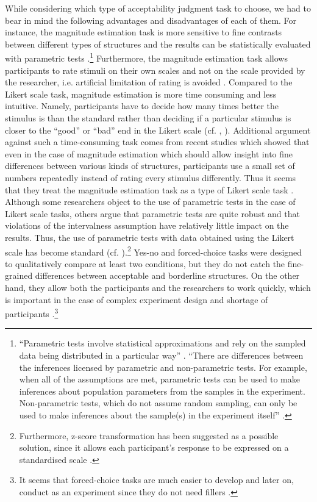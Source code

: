 While considering which type of acceptability judgment task to choose, we had to bear in mind the following advantages and disadvantages of each of them. For instance, the magnitude estimation task is more sensitive to fine contrasts between different types of structures and the results can be statistically evaluated with parametric tests \citep[cf.][8]{Dabrowska10}.\footnote{“Parametric tests involve statistical approximations and rely on the sampled data being distributed in a particular way” \citep[322]{Gries13}. “There are differences between the inferences licensed by parametric and non-parametric tests. For example, when all of the assumptions are met, parametric tests can be used to make inferences about population parameters from the samples in the experiment. Non-parametric tests, which do not assume random sampling, can only be used to make inferences about the sample(s) in the experiment itself” \citep[44]{SchutzeSprouse13}.} Furthermore, the magnitude estimation task allows participants to rate stimuli on their own scales and not on the scale provided by the researcher, i.e. artificial limitation of rating is avoided \citep[103]{Hoffmann13}. Compared to the Likert scale task, magnitude estimation is more time consuming and less intuitive. Namely, participants have to decide how many times better the stimulus is than the standard rather than deciding if a particular stimulus is closer to the ``good'' or ``bad'' end in the Likert scale (cf. \citealt[8]{Dabrowska10}, \citealt[33, 35]{SchutzeSprouse13}). Additional argument against such a time-consuming task comes from recent studies which showed that even in the case of magnitude estimation which should allow insight into fine differences between various kinds of structures, participants use a small set of numbers repeatedly instead of rating every stimulus differently. Thus it seems that they treat the magnitude estimation task as a type of Likert scale task \citep[cf.][34f]{SchutzeSprouse13}. Although some researchers object to the use of parametric tests in the case of Likert scale tasks, others argue that parametric tests are quite robust and that violations of the intervalness assumption have relatively little impact on the results. Thus, the use of parametric tests with data obtained using the Likert scale has become standard (cf. \citealt{Blaikie03,Pell05}).\footnote{Furthermore, z-score transformation has been suggested as a possible solution, since it allows each participant’s response to be expressed on a standardised scale \citep[cf.][34, 43]{SchutzeSprouse13}. } Yes-no and forced-choice tasks were designed to qualitatively compare  at least two conditions, but they do not catch the fine-grained differences between acceptable and borderline structures. On the other hand, they allow both the participants and the researchers to work quickly, which is important in the case of complex experiment design and shortage of participants \citep[cf.][31ff]{SchutzeSprouse13}.\footnote{It seems that forced-choice tasks are much easier to develop and later on, conduct as an experiment since they do not need fillers \citep[cf.][32]{SchutzeSprouse13}.}  
